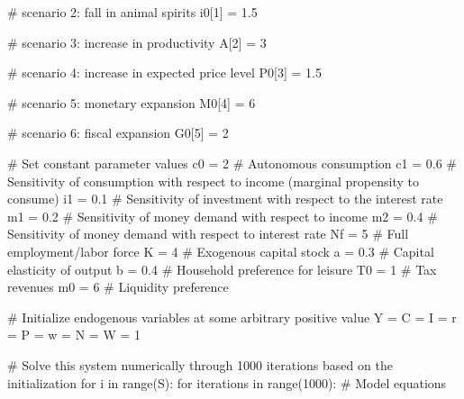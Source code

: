 \documentclass[
  letterpaper,
  DIV=11,
  numbers=noendperiod]{scrreprt}
\newenvironment{Shaded}{\begin{snugshade}}{\end{snugshade}}
\newcommand{\BuiltInTok}[1]{\textcolor[rgb]{0.00,0.23,0.31}{#1}}
\newcommand{\CommentTok}[1]{\textcolor[rgb]{0.37,0.37,0.37}{#1}}
\newcommand{\ControlFlowTok}[1]{\textcolor[rgb]{0.00,0.23,0.31}{#1}}
\newcommand{\DecValTok}[1]{\textcolor[rgb]{0.68,0.00,0.00}{#1}}
\newcommand{\FloatTok}[1]{\textcolor[rgb]{0.68,0.00,0.00}{#1}}
\newcommand{\KeywordTok}[1]{\textcolor[rgb]{0.00,0.23,0.31}{#1}}
\newcommand{\NormalTok}[1]{\textcolor[rgb]{0.00,0.23,0.31}{#1}}
\newcommand{\OperatorTok}[1]{\textcolor[rgb]{0.37,0.37,0.37}{#1}}
\begin{document}
\begin{tcolorbox}
\begin{Shaded}
\begin{Highlighting}[]
\CommentTok{\# scenario 2: fall in animal spirits}
\NormalTok{i0[}\DecValTok{1}\NormalTok{] }\OperatorTok{=} \FloatTok{1.5}

\CommentTok{\# scenario 3: increase in productivity}
\NormalTok{A[}\DecValTok{2}\NormalTok{] }\OperatorTok{=} \DecValTok{3}

\CommentTok{\# scenario 4: increase in expected price level}
\NormalTok{P0[}\DecValTok{3}\NormalTok{] }\OperatorTok{=} \FloatTok{1.5}

\CommentTok{\# scenario 5: monetary expansion}
\NormalTok{M0[}\DecValTok{4}\NormalTok{] }\OperatorTok{=} \DecValTok{6}

\CommentTok{\# scenario 6: fiscal expansion}
\NormalTok{G0[}\DecValTok{5}\NormalTok{] }\OperatorTok{=} \DecValTok{2}

\CommentTok{\# Set constant parameter values}
\NormalTok{c0 }\OperatorTok{=} \DecValTok{2}  \CommentTok{\# Autonomous consumption}
\NormalTok{c1 }\OperatorTok{=} \FloatTok{0.6}  \CommentTok{\# Sensitivity of consumption with respect to income (marginal propensity to consume)}
\NormalTok{i1 }\OperatorTok{=} \FloatTok{0.1}  \CommentTok{\# Sensitivity of investment with respect to the interest rate}
\NormalTok{m1 }\OperatorTok{=} \FloatTok{0.2}  \CommentTok{\# Sensitivity of money demand with respect to income}
\NormalTok{m2 }\OperatorTok{=} \FloatTok{0.4}  \CommentTok{\# Sensitivity of money demand with respect to interest rate}
\NormalTok{Nf }\OperatorTok{=} \DecValTok{5}  \CommentTok{\# Full employment/labor force}
\NormalTok{K }\OperatorTok{=} \DecValTok{4}  \CommentTok{\# Exogenous capital stock}
\NormalTok{a }\OperatorTok{=} \FloatTok{0.3}  \CommentTok{\# Capital elasticity of output}
\NormalTok{b }\OperatorTok{=} \FloatTok{0.4}  \CommentTok{\# Household preference for leisure}
\NormalTok{T0 }\OperatorTok{=} \DecValTok{1}  \CommentTok{\# Tax revenues}
\NormalTok{m0 }\OperatorTok{=} \DecValTok{6}  \CommentTok{\# Liquidity preference}

\CommentTok{\# Initialize endogenous variables at some arbitrary positive value}
\NormalTok{Y }\OperatorTok{=}\NormalTok{ C }\OperatorTok{=}\NormalTok{ I }\OperatorTok{=}\NormalTok{ r }\OperatorTok{=}\NormalTok{ P }\OperatorTok{=}\NormalTok{ w }\OperatorTok{=}\NormalTok{ N }\OperatorTok{=}\NormalTok{ W }\OperatorTok{=} \DecValTok{1}

\CommentTok{\# Solve this system numerically through 1000 iterations based on the initialization}
\ControlFlowTok{for}\NormalTok{ i }\KeywordTok{in} \BuiltInTok{range}\NormalTok{(S):}
    \ControlFlowTok{for}\NormalTok{ iterations }\KeywordTok{in} \BuiltInTok{range}\NormalTok{(}\DecValTok{1000}\NormalTok{):}
        \CommentTok{\# Model equations}


\end{Highlighting}
\end{Shaded}
\end{tcolorbox}
\end{document}
